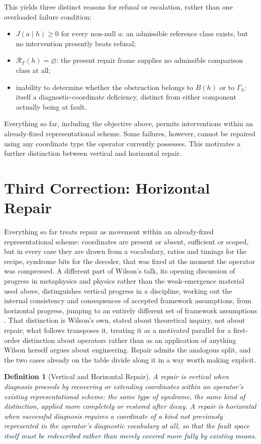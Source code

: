 \documentclass[11pt]{article}
\newtheorem{definition}{Definition}[section]
\begin{document}
This yields three distinct reasons for refusal or escalation, rather
than one overloaded failure condition:
\begin{itemize}
	\item $J(a \mid h) \geq 0$ for every non-null $a$: an admissible
		reference class exists, but no intervention presently beats refusal;
	\item $\mathcal{R}_\Gamma(h) = \varnothing$: the present repair frame
		supplies no admissible comparison class at all;
	\item inability to determine whether the obstruction belongs to $B(h)$
		or to $\Gamma_h$: itself a diagnostic-coordinate deficiency, distinct
		from either component actually being at fault.
\end{itemize}

Everything so far, including the objective above, permits interventions
within an already-fixed representational scheme. Some failures, however,
cannot be repaired using any coordinate type the operator currently
possesses. This motivates a further distinction between vertical and
horizontal repair.


\section{Third Correction: Horizontal Repair}

Everything so far treats repair as movement within an already-fixed representational scheme: coordinates are present or absent, sufficient or scoped, but in every case they are drawn from a vocabulary, ratios and timings for the recipe, syndrome bits for the decoder, that was fixed at the moment the operator was compressed. A different part of Wilson's talk, its opening discussion of progress in metaphysics and physics rather than the weak-emergence material used above, distinguishes vertical progress in a discipline, working out the internal consistency and consequences of accepted framework assumptions, from horizontal progress, jumping to an entirely different set of framework assumptions \cite{wilson2014}. That distinction is Wilson's own, stated about theoretical inquiry, not about repair; what follows transposes it, treating it as a motivated parallel for a first-order distinction about operators rather than as an application of anything Wilson herself argues about engineering. Repair admits the analogous split, and the two cases already on the table divide along it in a way worth making explicit.

\begin{definition}[Vertical and Horizontal Repair]
A repair is vertical when diagnosis proceeds by recovering or extending coordinates within an operator's existing representational scheme: the same type of syndrome, the same kind of distinction, applied more completely or restored after decay. A repair is horizontal when successful diagnosis requires a coordinate of a kind not previously represented in the operator's diagnostic vocabulary at all, so that the fault space itself must be redescribed rather than merely covered more fully by existing means.
\end{definition}
\end{document}
